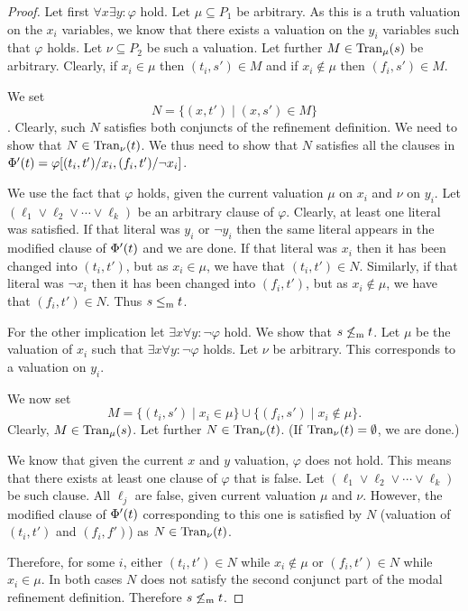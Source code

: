 \begin{proof}
Let first $\forall x \exists y : \varphi$ hold.
Let $\mu \subseteq P_1$ be arbitrary. As this is a truth valuation
on the $x_i$ variables, we know that there exists a valuation
on the $y_i$ variables such that $\varphi$ holds. Let $\nu \subseteq P_2$
be such a valuation.
Let further $M \in \mathrm{Tran}_\mu(s)$ be arbitrary.
Clearly, if $x_i \in \mu$ then $(t_i,s') \in M$ and 
if $x_i \not\in \mu$ then $(f_i,s') \in M$.

We set \[N = \{ (x,t') \mid (x,s') \in M\}\]. Clearly, such $N$ satisfies
both conjuncts of the refinement definition. We need to show that 
$N \in \mathrm{Tran}_\nu(t)$. We thus need to show that $N$ satisfies
all the clauses in $\mathrm{\Phi}'(t)=\varphi[(t_i,t')/x_i,(f_i,t')/\neg x_i]$.

We use the fact that $\varphi$ holds, given the current valuation
$\mu$ on $x_i$ and $\nu$ on $y_i$.
Let $(\ell_1 \vee \ell_2 \vee \cdots \vee \ell_k)$ be an arbitrary clause
of $\varphi$. Clearly, at least one literal was satisfied.
If that literal was $y_i$ or $\neg y_i$ then the same literal appears
in the modified clause of $\mathrm{\Phi}'(t)$ and we are done.
If that literal was $x_i$ then it has been changed into
$(t_i,t')$, but as $x_i \in \mu$, we have that $(t_i,t') \in N$.
Similarly, if that literal was $\neg x_i$ then it has been 
changed into $(f_i,t')$, but as $x_i \not\in\mu$, we have
that $(f_i,t') \in N$. Thus $s \le_\mathrm m t$.

For the other implication let 
$\exists x \forall y : \neg \varphi$ hold.  We show that $s \not\le_\mathrm m t$.
Let $\mu$ be the valuation of $x_i$ such that 
$\exists x \forall y : \neg \varphi$ holds.
Let $\nu$ be arbitrary. This corresponds to a valuation on $y_i$.

We now set 
\[
M = \{ (t_i, s') \mid x_i \in \mu \} \cup \{ (f_i, s') \mid x_i \not\in \mu \}.
\] 
Clearly, $M\in\mathrm{Tran}_\mu(s)$. Let further $N \in \mathrm{Tran}_\nu(t)$. (If $\mathrm{Tran}_\nu(t) = \emptyset$, we are done.)

We know that given the current $x$ and $y$ valuation, $\varphi$ does not hold.
This means that there exists at least one clause of $\varphi$ that is false.
Let $(\ell_1 \vee \ell_2 \vee \cdots \vee \ell_k)$ be such clause. 
All $\ell_j$ are false, given current valuation $\mu$ and $\nu$.
However, the modified clause of $\mathrm{\Phi}'(t)$ corresponding to this one
is satisfied by $N$ (valuation of $(t_i,t')$ and $(f_i,f')$) as $N\in\mathrm{Tran}_\nu(t)$.

Therefore, for some $i$,
     either $(t_i,t') \in N$ while $x_i \not \in \mu$
    or $(f_i,t') \in N$ while $x_i \in \mu$.
In both cases $N$ does not satisfy 
the second conjunct part of the modal refinement
definition. Therefore $s \not\le_\mathrm m t$.
\end{proof}


